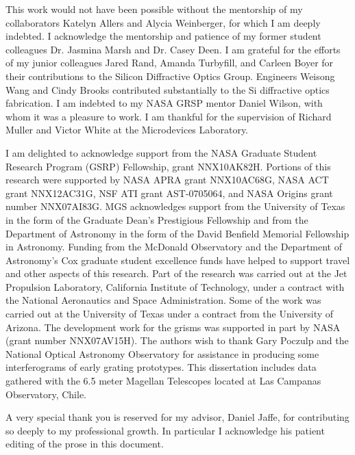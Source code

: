 \documentclass[12pt]{report}	%
\begin{document}
\begin{acknowledgments}		%
%

This work would not have been possible without the mentorship of my collaborators Katelyn Allers and Alycia Weinberger, for which I am deeply indebted.  I acknowledge the mentorship and patience of my former student colleagues Dr. Jasmina Marsh and Dr. Casey Deen.  I am grateful for the efforts of my junior colleagues Jared Rand, Amanda Turbyfill, and Carleen Boyer for their contributions to the Silicon Diffractive Optics Group.  Engineers Weisong Wang and Cindy Brooks contributed substantially to the Si diffractive optics fabrication.  I am indebted to my NASA GRSP mentor Daniel Wilson, with whom it was a pleasure to work.  I am thankful for the supervision of Richard Muller and Victor White at the Microdevices Laboratory.  

I am delighted to acknowledge support from the NASA Graduate Student Research Program (GSRP) Fellowship, grant NNX10AK82H.  Portions of this research were supported by NASA APRA grant NNX10AC68G, NASA ACT grant NNX12AC31G, NSF ATI grant AST-0705064, and NASA Origins grant number NNX07AI83G.  MGS acknowledges support from the University of Texas in the form of the Graduate Dean's Prestigious Fellowship and from the Department of Astronomy in the form of the David Benfield Memorial Fellowship in Astronomy.  Funding from the McDonald Observatory and the Department of Astronomy's Cox graduate student excellence funds have helped to support travel and other aspects of this research.  Part of the research was carried out at the Jet Propulsion Laboratory, California Institute of Technology, under a contract with the National Aeronautics and Space Administration.  Some of the work was carried out at the University of Texas under a contract from the University of Arizona.  The development work for the grisms was supported in part by NASA (grant number NNX07AV15H).  The authors wish to thank Gary Poczulp and the National Optical Astronomy Observatory for assistance in producing some interferograms of early grating prototypes.  This dissertation includes data gathered with the 6.5 meter Magellan Telescopes located at Las Campanas Observatory, Chile.


A very special thank you is reserved for my advisor, Daniel Jaffe, for contributing so deeply to my professional growth.  In particular I acknowledge his patient editing of the prose in this document.

\end{acknowledgments}
\end{document}
